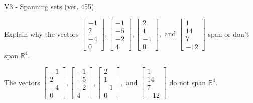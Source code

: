 \begin{exercise}
  \begin{exerciseTitle}V3 - Spanning sets (ver. 455)\end{exerciseTitle}
  \begin{exerciseStatement}
    Explain why the vectors \(\left[\begin{array}{r}
-1 \\
2 \\
-4 \\
0
\end{array}\right] , \left[\begin{array}{r}
-1 \\
-5 \\
-2 \\
4
\end{array}\right] , \left[\begin{array}{r}
2 \\
1 \\
-1 \\
0
\end{array}\right] , \text{ and } \left[\begin{array}{r}
1 \\
14 \\
7 \\
-12
\end{array}\right]\) span or don't span \(\mathbb{R}^4\). 
	


  \end{exerciseStatement}
  \begin{exerciseAnswer}
   The vectors \(\left[\begin{array}{r}
-1 \\
2 \\
-4 \\
0
\end{array}\right] , \left[\begin{array}{r}
-1 \\
-5 \\
-2 \\
4
\end{array}\right] , \left[\begin{array}{r}
2 \\
1 \\
-1 \\
0
\end{array}\right] , \text{ and } \left[\begin{array}{r}
1 \\
14 \\
7 \\
-12
\end{array}\right]\) 
  	 do not  
	span \(\mathbb{R}^4\).
  


  \end{exerciseAnswer}
\end{exercise}